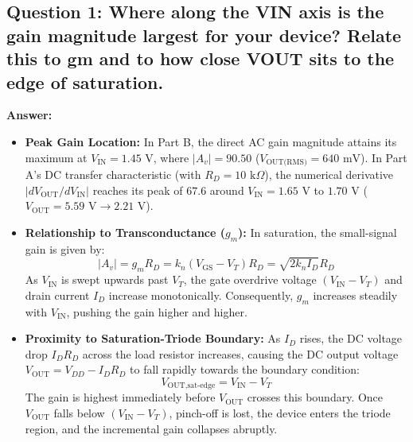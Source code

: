 \documentclass[11pt,a4paper]{article}
\begin{document}
\subsection{Question 1: Where along the VIN axis is the gain magnitude largest for your device? Relate this to gm and to how close VOUT sits to the edge of saturation.}
\textbf{Answer:}
\begin{itemize}
    \item \textbf{Peak Gain Location:} In Part B, the direct AC gain magnitude attains its maximum at \textbf{$V_{\text{IN}} = 1.45\text{ V}$}, where $|A_v| = 90.50$ ($V_{\text{OUT(RMS)}} = 640\text{ mV}$). In Part A's DC transfer characteristic (with $R_D = 10\text{ k}\Omega$), the numerical derivative $|dV_{\text{OUT}}/dV_{\text{IN}}|$ reaches its peak of \textbf{$67.6$} around $V_{\text{IN}} = 1.65\text{ V}$ to $1.70\text{ V}$ ($V_{\text{OUT}} = 5.59\text{ V} \to 2.21\text{ V}$).
    \item \textbf{Relationship to Transconductance ($g_m$):} In saturation, the small-signal gain is given by:
    \begin{equation}
        |A_v| = g_m R_D = k_n (V_{\text{GS}} - V_T) R_D = \sqrt{2 k_n I_D} R_D
    \end{equation}
    As $V_{\text{IN}}$ is swept upwards past $V_T$, the gate overdrive voltage $(V_{\text{IN}} - V_T)$ and drain current $I_D$ increase monotonically. Consequently, $g_m$ increases steadily with $V_{\text{IN}}$, pushing the gain higher and higher.
    \item \textbf{Proximity to Saturation-Triode Boundary:} As $I_D$ rises, the DC voltage drop $I_D R_D$ across the load resistor increases, causing the DC output voltage $V_{\text{OUT}} = V_{DD} - I_D R_D$ to fall rapidly towards the boundary condition:
    \begin{equation}
        V_{\text{OUT,sat-edge}} = V_{\text{IN}} - V_T
    \end{equation}
    The gain is highest immediately before $V_{\text{OUT}}$ crosses this boundary. Once $V_{\text{OUT}}$ falls below $(V_{\text{IN}} - V_T)$, pinch-off is lost, the device enters the triode region, and the incremental gain collapses abruptly.
\end{itemize}
\end{document}
